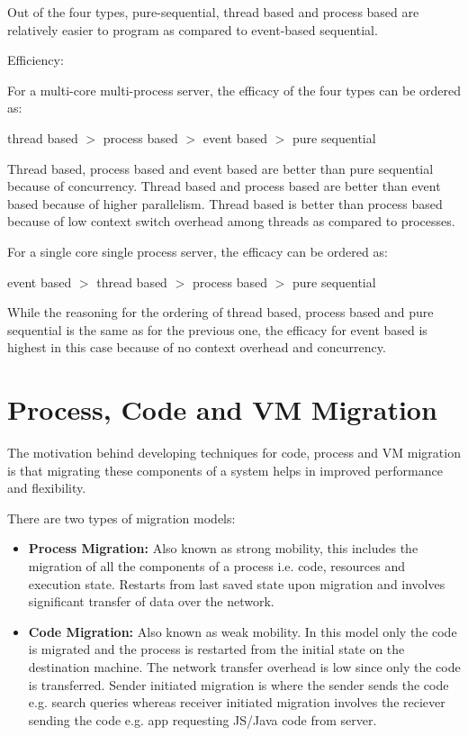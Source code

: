 \documentclass[twoside]{article}
\begin{document}
Out of the four types, pure-sequential, thread based and process based are relatively easier to program as compared to event-based sequential.

Efficiency:

For a multi-core multi-process server, the efficacy of the four types can be ordered as:

thread based $>$ process based $>$ event based $>$ pure sequential

Thread based, process based and event based are better than pure sequential because of concurrency. Thread based and process based are better than event based because of higher parallelism. Thread based is better than process based because of low context switch overhead among threads as compared to processes.

For a single core single process server, the efficacy can be ordered as:

event based $>$ thread based $>$ process based $>$ pure sequential

While the reasoning for the ordering of thread based, process based and pure sequential is the same as for the previous one, the efficacy for event based is highest in this case because of no context overhead and concurrency.

\section{Process, Code and VM Migration}
The motivation behind developing techniques for code, process and VM migration is that migrating these components of a system helps in improved performance and flexibility.

There are two types of migration models:
\begin{itemize}
    \item \textbf{Process Migration:} Also known as strong mobility, this includes the migration of all the components of a process i.e. code, resources and execution state. Restarts from last saved state upon migration and involves significant transfer of data over the network.
    \item \textbf{Code Migration:} Also known as weak mobility. In this model only the code is migrated and the process is restarted from the initial state on the destination machine. The network transfer overhead is low since only the code is transferred. Sender initiated migration is where the sender sends the code e.g. search queries whereas receiver initiated migration involves the reciever sending the code e.g. app requesting JS/Java code from server.
\end{itemize}
\end{document}
